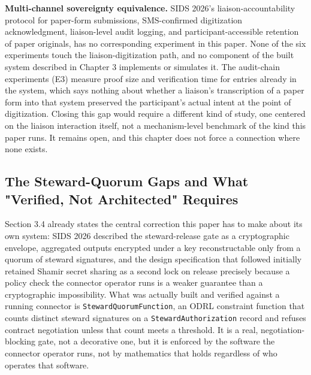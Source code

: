 \textbf{Multi-channel sovereignty equivalence.} SIDS 2026's liaison-accountability protocol for paper-form submissions, SMS-confirmed digitization acknowledgment, liaison-level audit logging, and participant-accessible retention of paper originals, has no corresponding experiment in this paper. None of the six experiments touch the liaison-digitization path, and no component of the built system described in Chapter 3 implements or simulates it. The audit-chain experiments (E3) measure proof size and verification time for entries already in the system, which says nothing about whether a liaison's transcription of a paper form into that system preserved the participant's actual intent at the point of digitization. Closing this gap would require a different kind of study, one centered on the liaison interaction itself, not a mechanism-level benchmark of the kind this paper runs. It remains open, and this chapter does not force a connection where none exists.

\subsection{The Steward-Quorum Gaps and What "Verified, Not Architected" Requires}

Section 3.4 already states the central correction this paper has to make about its own system: SIDS 2026 described the steward-release gate as a cryptographic envelope, aggregated outputs encrypted under a key reconstructable only from a quorum of steward signatures, and the design specification that followed initially retained Shamir secret sharing as a second lock on release precisely because a policy check the connector operator runs is a weaker guarantee than a cryptographic impossibility. What was actually built and verified against a running connector is \texttt{StewardQuorumFunction}, an ODRL constraint function that counts distinct steward signatures on a \texttt{StewardAuthorization} record and refuses contract negotiation unless that count meets a threshold. It is a real, negotiation-blocking gate, not a decorative one, but it is enforced by the software the connector operator runs, not by mathematics that holds regardless of who operates that software.

